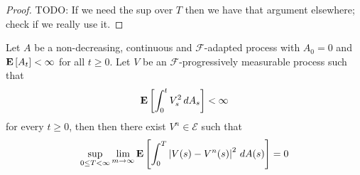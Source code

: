 \begin{proof}
TODO: If we need the sup over $T$ then we have that argument elsewhere; check if we really use it.
\end{proof}

\begin{lem}Let $A$ be a non-decreasing, continuous and $\mathcal{F}$-adapted process with $A_0=0$ and $\textbf{E}\left[A_t\right] < \infty$ for all $t \geq 0$.  Let $V$ be an $\mathcal{F}$-progressively measurable process such that 
\begin{align*}
\textbf{E}\left[\int_0^t V^2_s \, dA_s\right] < \infty
\end{align*}
for every $t \geq 0$, then 
then there exist $V^n \in \mathcal{E}$ such that 
\begin{align*}
\sup_{0 \leq T < \infty} \lim_{m \to \infty} \textbf{E}\left[\int_0^T \left \vert V(s) - V^n(s) \right \vert^2 \, dA(s)\right] = 0
\end{align*}
\end{lem}
